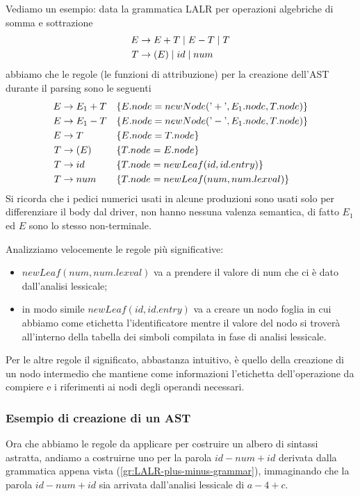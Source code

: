 \documentclass[class=book, crop=false, oneside, 12pt]{standalone}
\begin{document}
\noindent Vediamo un esempio: data la grammatica LALR per operazioni algebriche di somma e sottrazione 
\begin{align}
    \label{gr:LALR-plus-minus-grammar}
    E &\to E+T \mid E-T \mid T \\  
    T &\to (E) \mid id \mid num \notag \nonumber
\end{align}
abbiamo che le regole (le funzioni di attribuzione) per la creazione dell'AST durante il parsing sono le seguenti
\begin{align}
    \label{SDD:LALR-grammar}
    E &\to E_1+T & & \{E.node = newNode(\textrm{'}+\textrm{'}, E_1.node, T.node)\} \\
    E &\to E_1-T & & \{E.node = newNode(\textrm{'}-\textrm{'}, E_1.node, T.node)\} \notag \nonumber \\
    E &\to T & & \{E.node = T.node\} \notag \nonumber \\
    T &\to (E) & & \{T.node = E.node\} \notag \nonumber \\
    T &\to id & & \{T.node = newLeaf(id, id.entry)\} \notag \nonumber \\
    T &\to num & & \{T.node = newLeaf(num, num.lexval)\} \notag \nonumber
\end{align}
Si ricorda che i pedici numerici usati in alcune produzioni sono usati solo per differenziare il body dal driver, non hanno nessuna valenza semantica, di fatto \(E_1\) ed \(E\) sono lo stesso non-terminale.

Analizziamo velocemente le regole più significative:
\begin{itemize}
    \item \(newLeaf(num, num.lexval)\) va a prendere il valore di num che ci è dato dall'analisi lessicale; 
    \item in modo simile \(newLeaf(id, id.entry)\) va a creare un nodo foglia in cui abbiamo come etichetta l'identificatore mentre il valore del nodo si troverà all'interno della tabella dei simboli compilata in fase di analisi lessicale.
\end{itemize}

Per le altre regole il significato, abbastanza intuitivo, è quello della creazione di un nodo intermedio che mantiene come informazioni l'etichetta dell'operazione da compiere e i riferimenti ai nodi degli operandi necessari.

\subsubsection{Esempio di creazione di un AST}
Ora che abbiamo le regole da applicare per costruire un albero di sintassi astratta, andiamo a costruirne uno per la parola \(id-num+id\) derivata dalla grammatica appena vista (\ref{gr:LALR-plus-minus-grammar}), immaginando che la parola \(id-num+id\) sia arrivata dall'analisi lessicale di \(a-4+c\).
\end{document}
